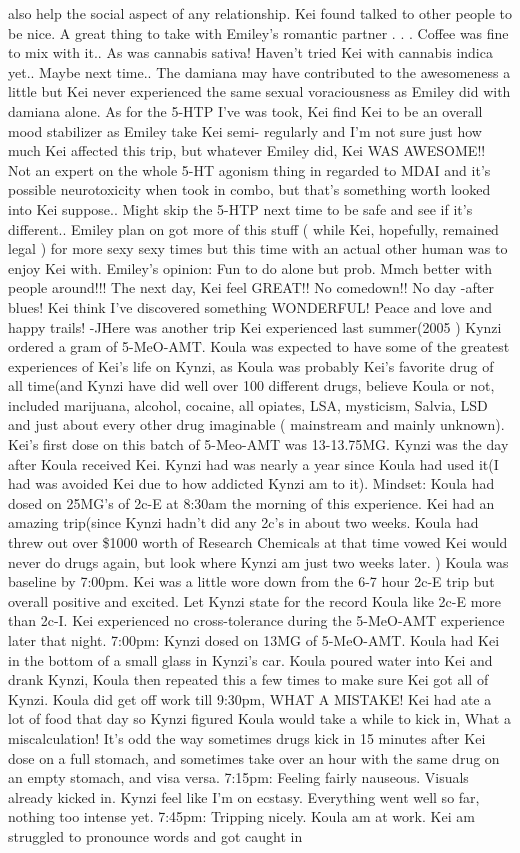 \documentclass[12pt]{book}
\begin{document}
also help the social aspect of any relationship. Kei found talked to other people to be nice. A great thing to take with Emiley's romantic partner . . .  Coffee was fine to mix with it.. As was cannabis sativa! Haven't tried Kei with cannabis indica yet.. Maybe next time.. The damiana may have contributed to the awesomeness a little but Kei never experienced the same sexual voraciousness as Emiley did with damiana alone. As for the 5-HTP I've was took, Kei find Kei to be an overall mood stabilizer as Emiley take Kei semi- regularly and I'm not sure just how much Kei affected this trip, but whatever Emiley did, Kei WAS AWESOME!! Not an expert on the whole 5-HT agonism thing in regarded to MDAI and it's possible neurotoxicity when took in combo, but that's something worth looked into Kei suppose.. Might skip the 5-HTP next time to be safe and see if it's different.. Emiley plan on got more of this stuff ( while Kei, hopefully, remained legal ) for more sexy sexy times but this time with an actual other human was to enjoy Kei with. Emiley's opinion: Fun to do alone but prob. Mmch better with people around!!! The next day, Kei feel GREAT!! No comedown!! No day -after blues! Kei think I've discovered something WONDERFUL! Peace and love and happy trails! -JHere was another trip Kei experienced last summer(2005 ) Kynzi ordered a gram of 5-MeO-AMT. Koula was expected to have some of the greatest experiences of Kei's life on Kynzi, as Koula was probably Kei's favorite drug of all time(and Kynzi have did well over 100 different drugs, believe Koula or not, included marijuana, alcohol, cocaine, all opiates, LSA, mysticism, Salvia, LSD and just about every other drug imaginable ( mainstream and mainly unknown). Kei's first dose on this batch of 5-Meo-AMT was 13-13.75MG. Kynzi was the day after Koula received Kei. Kynzi had was nearly a year since Koula had used it(I had was avoided Kei due to how addicted Kynzi am to it). Mindset: Koula had dosed on 25MG's of 2c-E at 8:30am the morning of this experience. Kei had an amazing trip(since Kynzi hadn't did any 2c's in about two weeks. Koula had threw out over \$1000 worth of Research Chemicals at that time vowed Kei would never do drugs again, but look where Kynzi am just two weeks later. ) Koula was baseline by 7:00pm. Kei was a little wore down from the 6-7 hour 2c-E trip but overall positive and excited. Let Kynzi state for the record Koula like 2c-E more than 2c-I. Kei experienced no cross-tolerance during the 5-MeO-AMT experience later that night. 7:00pm: Kynzi dosed on 13MG of 5-MeO-AMT. Koula had Kei in the bottom of a small glass in Kynzi's car. Koula poured water into Kei and drank Kynzi, Koula then repeated this a few times to make sure Kei got all of Kynzi. Koula did get off work till 9:30pm, WHAT A MISTAKE! Kei had ate a lot of food that day so Kynzi figured Koula would take a while to kick in, What a miscalculation! It's odd the way sometimes drugs kick in 15 minutes after Kei dose on a full stomach, and sometimes take over an hour with the same drug on an empty stomach, and visa versa. 7:15pm: Feeling fairly nauseous. Visuals already kicked in. Kynzi feel like I'm on ecstasy. Everything went well so far, nothing too intense yet. 7:45pm: Tripping nicely. Koula am at work. Kei am struggled to pronounce words and got caught in 
\end{document}
